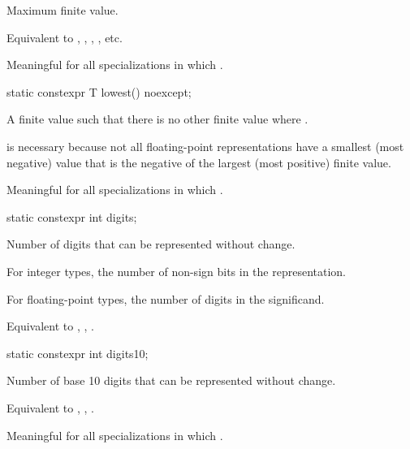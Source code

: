 \begin{itemdescr}
\pnum
Maximum finite value.
\begin{footnote}
Equivalent to , ,
, , etc.
\end{footnote}

\pnum
Meaningful for all specializations in which
.
\end{itemdescr}

%
\begin{itemdecl}
static constexpr T lowest() noexcept;
\end{itemdecl}

\begin{itemdescr}
\pnum
A finite value  such that there is no other finite
value  where .
\begin{footnote}
 is necessary because not all
floating-point representations have a smallest (most negative) value that is
the negative of the largest (most positive) finite value.
\end{footnote}

\pnum
Meaningful for all specializations in which .
\end{itemdescr}

%
\begin{itemdecl}
static constexpr int digits;
\end{itemdecl}

\begin{itemdescr}
\pnum
Number of
digits that can be represented without change.

\pnum
For integer types, the number of non-sign bits in the representation.

\pnum
For floating-point types, the number of  digits in the
significand.
\begin{footnote}
Equivalent to , ,
.
\end{footnote}
\end{itemdescr}

%
\begin{itemdecl}
static constexpr int digits10;
\end{itemdecl}

\begin{itemdescr}
\pnum
Number of base 10 digits that can be represented without
change.
\begin{footnote}
Equivalent to , ,
.
\end{footnote}

\pnum
Meaningful for all specializations in which
.
\end{itemdescr}

